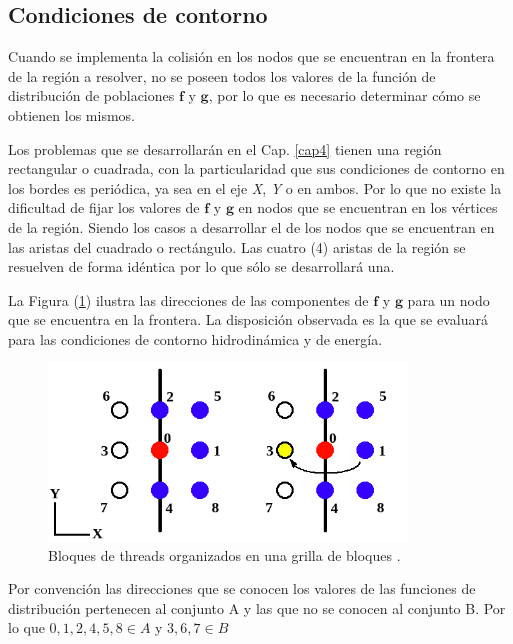 \subsection{Condiciones de contorno}

Cuando se implementa la colisión en los nodos que se encuentran en la frontera de la región a resolver, no se poseen todos los valores de la función de distribución de poblaciones $\mathbf{f}$ y $\mathbf{g}$, por lo que es necesario determinar cómo se obtienen los mismos. 

Los problemas que se desarrollarán en el Cap. \ref{cap4} tienen una región rectangular o cuadrada, con la particularidad que sus  condiciones de contorno en los bordes es periódica, ya sea en el eje \textit{X}, \textit{Y} o en ambos. Por lo que no existe la dificultad de fijar los valores de $\mathbf{f}$ y $\mathbf{g}$ en nodos que se encuentran en los vértices de la región. Siendo los casos a desarrollar  el de los nodos que se encuentran en las aristas del cuadrado o rectángulo. Las cuatro (4) aristas de la región se resuelven de forma idéntica por lo que sólo se  desarrollará una.

La Figura (\ref{fig:CC_hidro}) ilustra las direcciones de las componentes de $\mathbf{f}$ y $\mathbf{g}$ para un nodo que se encuentra en la frontera. La disposición observada es la que se evaluará para las condiciones de contorno hidrodinámica y de energía.  

\begin{figure}[h!]
	\centering
	\includegraphics[width=0.85\textwidth]{figs/cap2/CC_hidrodinamica.png}
	\caption{Bloques de threads organizados en una grilla de bloques \cite{rinaldi2011modelos}.}
	\label{fig:CC_hidro}
\end{figure}

Por convención las direcciones que se conocen los valores de las funciones de distribución pertenecen al conjunto A y las que no se conocen al conjunto B. Por lo que $ 0, 1, 2, 4, 5, 8 \in A$ y $ 3, 6, 7 \in B$ 


